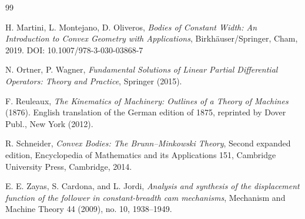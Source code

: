 \documentclass[11pt,letterpaper,reqno]{amsart}
\begin{document}
\begin{thebibliography}{99}

H. Martini, L. Montejano, D. Oliveros,
\textit{Bodies of Constant Width: An Introduction to Convex Geometry with Applications},
Birkhäuser/Springer, Cham, 2019. DOI: 10.1007/978-3-030-03868-7

N. Ortner, P. Wagner, \textit{Fundamental Solutions of Linear Partial Differential Operators: Theory and Practice}, Springer (2015).


F. Reuleaux, \textit{The Kinematics of Machinery: Outlines of a Theory of Machines} (1876). English translation of the German edition of 1875, reprinted by Dover Publ., New York (2012).

R. Schneider,
\textit{Convex Bodies: The Brunn--Minkowski Theory},
Second expanded edition, Encyclopedia of Mathematics and its Applications 151, Cambridge University Press, Cambridge, 2014.


E. E. Zayas, S. Cardona, and L. Jordi, \textit{Analysis and synthesis of the displacement function of the follower in constant-breadth cam mechanisms}, Mechanism and Machine Theory 44 (2009), no. 10, 1938--1949.

\end{thebibliography}
\end{document}
